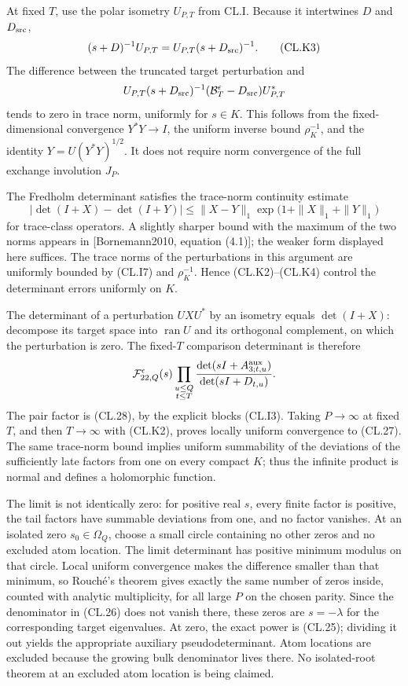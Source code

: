 \documentclass[a4paper,11pt]{article}
\numberwithin{equation}{section}
\begin{document}
At fixed \(T\), use the polar isometry \(U_{P,T}\) from CL.I. Because it intertwines \(D\) and \(D_{\rm src}\), \[
(s+D)^{-1}U_{P,T}
=U_{P,T}(s+D_{\rm src})^{-1}.
\tag{CL.K3}
\] The difference between the truncated target perturbation and \[
U_{P,T}(s+D_{\rm src})^{-1}
(\mathcal B_T^\epsilon-D_{\rm src})U_{P,T}^*
\] tends to zero in trace norm, uniformly for \(s\in K\). This follows from the fixed-dimensional convergence \(Y^*Y\to I\), the uniform inverse bound \(\rho_K^{-1}\), and the identity \(Y=U(Y^*Y)^{1/2}\). It does not require norm convergence of the full exchange involution \(J_P\).

The Fredholm determinant satisfies the trace-norm continuity estimate \[
|\det(I+X)-\det(I+Y)|
\leq \|X-Y\|_1
\exp\!\bigl(1+\|X\|_1+\|Y\|_1\bigr)
\tag{CL.K4}
\] for trace-class operators. A slightly sharper bound with the maximum of the two norms appears in {[}Bornemann2010, equation (4.1){]}; the weaker form displayed here suffices. The trace norms of the perturbations in this argument are uniformly bounded by (CL.I7) and \(\rho_K^{-1}\). Hence (CL.K2)--(CL.K4) control the determinant errors uniformly on \(K\).

The determinant of a perturbation \(U XU^*\) by an isometry equals \(\det(I+X)\): decompose its target space into \(\operatorname{ran}U\) and its orthogonal complement, on which the perturbation is zero. The fixed-\(T\) comparison determinant is therefore \[
\mathcal F_{22,Q}^\epsilon(s)
\prod_{\substack{u\leq Q\\t\leq T}}
\frac{\det(sI+A_{3;t,u}^{\rm aux})}
{\det(sI+D_{t,u})}.
\] The pair factor is (CL.28), by the explicit blocks (CL.I3). Taking \(P\to\infty\) at fixed \(T\), and then \(T\to\infty\) with (CL.K2), proves locally uniform convergence to (CL.27). The same trace-norm bound implies uniform summability of the deviations of the sufficiently late factors from one on every compact \(K\); thus the infinite product is normal and defines a holomorphic function.

The limit is not identically zero: for positive real \(s\), every finite factor is positive, the tail factors have summable deviations from one, and no factor vanishes. At an isolated zero \(s_0\in\Omega_Q\), choose a small circle containing no other zeros and no excluded atom location. The limit determinant has positive minimum modulus on that circle. Local uniform convergence makes the difference smaller than that minimum, so Rouché's theorem gives exactly the same number of zeros inside, counted with analytic multiplicity, for all large \(P\) on the chosen parity. Since the denominator in (CL.26) does not vanish there, these zeros are \(s=-\lambda\) for the corresponding target eigenvalues. At zero, the exact power is (CL.25); dividing it out yields the appropriate auxiliary pseudodeterminant. Atom locations are excluded because the growing bulk denominator lives there. No isolated-root theorem at an excluded atom location is being claimed.
\end{document}
